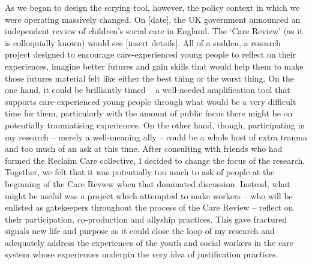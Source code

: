 As we began to design the scrying tool, however, the policy context in which we were operating massively changed. On [date], the UK government announced an independent review of children’s social care in England. The ‘Care Review’ (as it is colloquially known) would see [insert details]. All of a sudden, a research project designed to encourage care-experienced young people to reflect on their experiences, imagine better futures and gain skills that would help them to make those futures material felt like either the best thing or the worst thing. On the one hand, it could be brilliantly timed – a well-needed amplification tool that supports care-experienced young people through what would be a very difficult time for them, particularly with the amount of public focus there might be on potentially traumatising experiences. On the other hand, though, participating in my research – merely a well-meaning ally – could be a whole host of extra trauma and too much of an ask at this time. After consulting with friends who had formed the Reclaim Care collective, I decided to change the focus of the research. Together, we felt that it was potentially too much to ask of people at the beginning of the Care Review when that dominated discussion. Instead, what might be useful was a project which attempted to make workers – who will be enlisted as gatekeepers throughout the process of the Care Review – reflect on their participation, co-production and allyship practices. This gave fractured signals new life and purpose as it could close the loop of my research and adequately address the experiences of the youth and social workers in the care system whose experiences underpin the very idea of justification practices.  



